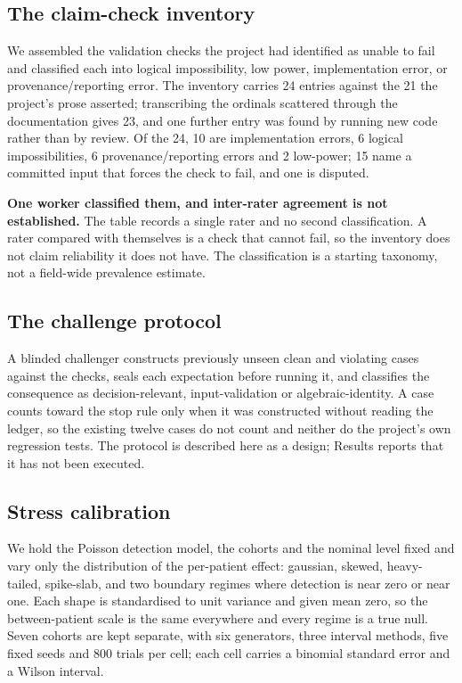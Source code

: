 
\subsection{The claim-check inventory}
We assembled the validation checks the project had identified as unable to fail
and classified each into logical impossibility, low power, implementation error,
or provenance/reporting error. The inventory carries 24 entries against the 21
the project's prose asserted; transcribing the ordinals scattered through the
documentation gives 23, and one further entry was found by running new code
rather than by review. Of the 24, 10 are implementation errors, 6 logical
impossibilities, 6 provenance/reporting errors and 2 low-power; 15 name a
committed input that forces the check to fail, and one is disputed.

\textbf{One worker classified them, and inter-rater agreement is not
established.} The table records a single rater and no second classification. A
rater compared with themselves is a check that cannot fail, so the inventory
does not claim reliability it does not have. The classification is a starting
taxonomy, not a field-wide prevalence estimate.

\subsection{The challenge protocol}
A blinded challenger constructs previously unseen clean and violating cases
against the checks, seals each expectation before running it, and classifies the
consequence as decision-relevant, input-validation or algebraic-identity. A case
counts toward the stop rule only when it was constructed without reading the
ledger, so the existing twelve cases do not count and neither do the project's
own regression tests. The protocol is described here as a design; Results reports
that it has not been executed.

\subsection{Stress calibration}
We hold the Poisson detection model, the cohorts and the nominal level fixed and
vary only the distribution of the per-patient effect: gaussian, skewed,
heavy-tailed, spike-slab, and two boundary regimes where detection is near zero or
near one. Each shape is standardised to unit variance and given mean zero, so the
between-patient scale is the same everywhere and every regime is a true null.
Seven cohorts are kept separate, with six generators, three interval methods,
five fixed seeds and 800 trials per cell; each cell carries a binomial standard
error and a Wilson interval.

